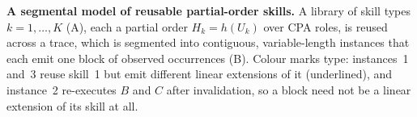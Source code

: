 \caption{\textbf{A segmental model of reusable partial-order skills.} A library
of skill types $k=1,\ldots,K$ (A), each a partial order $H_k=h(U_k)$ over CPA roles, is
reused across a trace, which is segmented into contiguous, variable-length
instances that each emit one block of observed occurrences (B). Colour marks
type: instances~1 and~3 reuse skill~1 but emit different linear extensions of it
(underlined), and instance~2 re-executes $B$ and $C$ after invalidation, so a
block need not be a linear extension of its skill at all.}
\label{fig:model}
